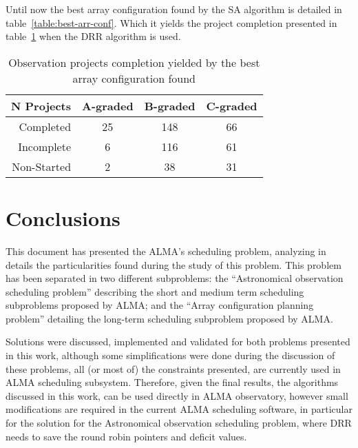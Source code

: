 Until now the best array configuration found by the SA algorithm is detailed in table~\ref{table:best-arr-conf}. Which it yields the project completion presented in table~\ref{table:best-solution-found} when the DRR algorithm is used.

\begin{table}[htbp]
\centering
\begin{tabular}{|r|c|c|c|} \hline
 N Projects & A-graded & B-graded & C-graded \\ \hline
 Completed & 25 & 148 & 66 \\ \hline
 Incomplete & 6 & 116 & 61 \\ \hline
 Non-Started & 2 & 38 & 31 \\ \hline
\end{tabular}
\caption{Observation projects completion yielded by the best array configuration found}
\label{table:best-solution-found}
\end{table}

\chapter{Conclusions}
This document has presented the ALMA's scheduling problem, analyzing in details the particularities found during the study of this problem. This problem has been separated in two different subproblems: the ``Astronomical observation scheduling problem'' describing the short and medium term scheduling subproblems proposed by ALMA; and the ``Array configuration planning problem'' detailing the long-term scheduling subproblem proposed by ALMA.

Solutions were discussed, implemented and validated for both problems presented in this work, although some simplifications were done during the discussion of these problems, all (or most of) the constraints presented, are currently used in ALMA scheduling subsystem. Therefore, given the final results, the algorithms discussed in this work, can be used directly in ALMA observatory, however small modifications are required in the current ALMA scheduling software, in particular for the solution for the Astronomical observation scheduling problem, where DRR needs to save the round robin pointers and deficit values.


